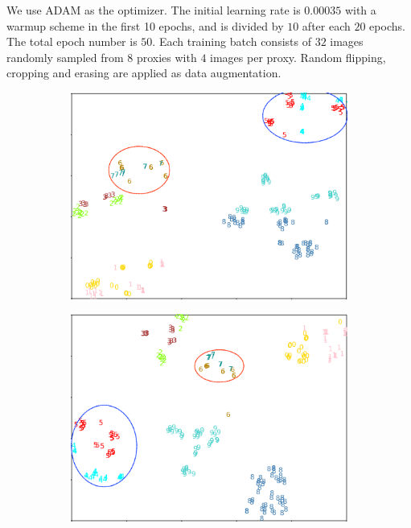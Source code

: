 \documentclass[letterpaper]{article} %
\begin{document}
We use ADAM as the optimizer. The initial learning rate is $0.00035$ with a warmup scheme in the first 10 epochs, and is divided by $10$ after each $20$ epochs. The total epoch number is $50$. Each training batch consists of $32$ images randomly sampled from $8$ proxies with $4$ images per proxy. Random flipping, cropping and erasing are applied as data augmentation. 

\begin{figure}[t]
\centering
\begin{subfigure}{0.29\textwidth}
\centering
\includegraphics[width=1.0\textwidth]{./model_v10_baseline.png} 
\end{subfigure}
\quad
\begin{subfigure}{0.29\textwidth}
\centering
\includegraphics[width=1.0\textwidth]{./model_v10_local.png}

\end{subfigure}
\end{figure}
\end{document}
